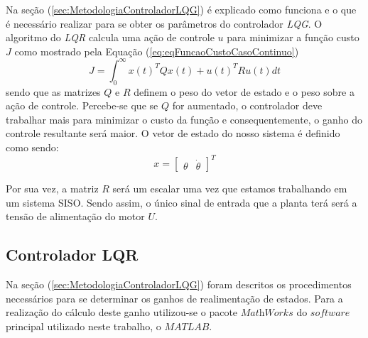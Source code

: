 Na seção (\ref{sec:MetodologiaControladorLQG}) é explicado como funciona e o que é necessário realizar para se obter os parâmetros do controlador \textit{LQG}. O algoritmo do \textit{LQR} calcula uma ação de controle $u$ para minimizar a função custo $J$ como mostrado pela Equação (\ref{eq:eqFuncaoCustoCasoContinuo})
\begin{equation}\label{eq:eqFuncaoCustoCasoContinuo}
    J = \int_{0}^{\infty} x(t)^TQx(t) + u(t)^TRu(t)dt
\end{equation}
sendo que as matrizes $Q$ e $R$ definem o peso do vetor de estado e o peso sobre a ação de controle. Percebe-se que se $Q$ for aumentado, o controlador deve trabalhar mais para minimizar o custo da função e consequentemente, o ganho do controle resultante será maior. O vetor de estado do nosso sistema é definido como sendo:
\begin{equation*}
x = \begin{bmatrix}
        \theta & \dot{\theta}
    \end{bmatrix} ^ T
\end{equation*}

Por sua vez, a matriz $R$ será um escalar uma vez que estamos trabalhando em um sistema SISO. Sendo assim, o único sinal de entrada que a planta terá será a tensão de alimentação do motor $U$.

\subsection{Controlador LQR}\label{subsec:ResultadoControladorLQR}

Na seção (\ref{sec:MetodologiaControladorLQG}) foram descritos os procedimentos necessários para se determinar os ganhos de realimentação de estados. Para a realização do cálculo deste ganho utilizou-se o pacote $\textit{MathWorks}$ do $\textit{software}$ principal utilizado neste trabalho, o $\textit{MATLAB}$.  %


